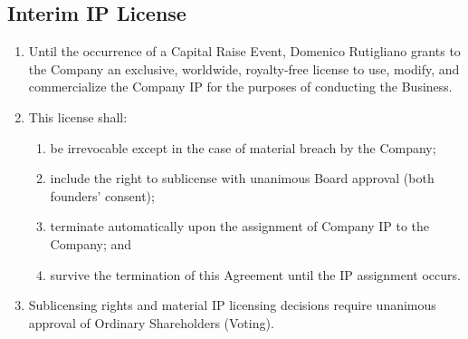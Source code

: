 \subsection{Interim IP License}
\begin{enumerate}[label=(\alph*)]
\item Until the occurrence of a Capital Raise Event, Domenico Rutigliano grants to the Company an exclusive, worldwide, royalty-free license to use, modify, and commercialize the Company IP for the purposes of conducting the Business.

\item This license shall:
    \begin{enumerate}[label=(\roman*)]
    \item be irrevocable except in the case of material breach by the Company;
    \item include the right to sublicense with unanimous Board approval (both founders' consent);
    \item terminate automatically upon the assignment of Company IP to the Company; and
    \item survive the termination of this Agreement until the IP assignment occurs.
    \end{enumerate}

\item Sublicensing rights and material IP licensing decisions require unanimous approval of Ordinary Shareholders (Voting).
\end{enumerate}

